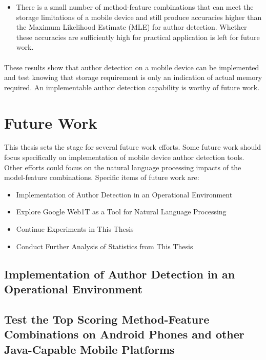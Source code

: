 \begin{itemize}
	\item There is a small number of method-feature combinations that can meet the storage limitations of a mobile device and still produce accuracies higher than the Maximum Likelihood Estimate (MLE) for author detection.  Whether these accuracies are sufficiently high for practical application is left for future work.
\end{itemize}
	
	\paragraph*{} These results show that author detection on a mobile device can be implemented and test knowing that storage requirement is only an indication of actual memory required.  An implementable author detection capability is worthy of future work.

\section{Future Work}

This thesis sets the stage for several future work efforts.  Some future work should focus specifically on implementation of mobile device author detection tools.  Other efforts could focus on the natural language processing impacts of the model-feature combinations. Specific items of future work are:
\begin{itemize}
	\item Implementation of Author Detection in an Operational Environment
	\item Explore Google Web1T as a Tool for Natural Language Processing
	\item Continue Experiments in This Thesis
	\item Conduct Further Analysis of Statistics from This Thesis
\end{itemize}

\begin{singlespace}
\section{Implementation of Author Detection in an Operational Environment}
\end{singlespace}

	\begin{singlespace}
	\subsection{Test the Top Scoring Method-Feature Combinations on Android Phones and other Java-Capable Mobile Platforms}
	\end{singlespace}
